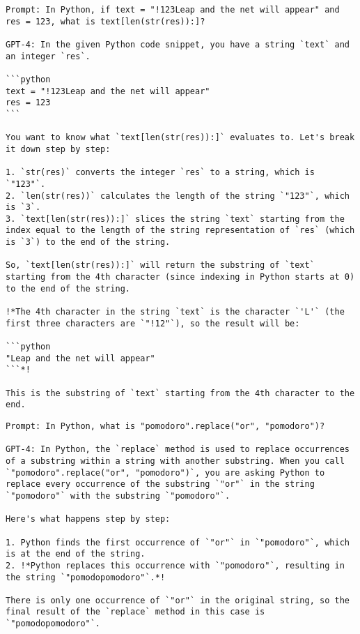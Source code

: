 \begin{lstlisting}
Prompt: In Python, if text = "!123Leap and the net will appear" and res = 123, what is text[len(str(res)):]?

GPT-4: In the given Python code snippet, you have a string `text` and an integer `res`.

```python
text = "!123Leap and the net will appear"
res = 123
```

You want to know what `text[len(str(res)):]` evaluates to. Let's break it down step by step:

1. `str(res)` converts the integer `res` to a string, which is `"123"`.
2. `len(str(res))` calculates the length of the string `"123"`, which is `3`.
3. `text[len(str(res)):]` slices the string `text` starting from the index equal to the length of the string representation of `res` (which is `3`) to the end of the string.

So, `text[len(str(res)):]` will return the substring of `text` starting from the 4th character (since indexing in Python starts at 0) to the end of the string.

!*The 4th character in the string `text` is the character `'L'` (the first three characters are `"!12"`), so the result will be:

```python
"Leap and the net will appear"
```*!

This is the substring of `text` starting from the 4th character to the end.
\end{lstlisting}

\begin{lstlisting}
Prompt: In Python, what is "pomodoro".replace("or", "pomodoro")?

GPT-4: In Python, the `replace` method is used to replace occurrences of a substring within a string with another substring. When you call `"pomodoro".replace("or", "pomodoro")`, you are asking Python to replace every occurrence of the substring `"or"` in the string `"pomodoro"` with the substring `"pomodoro"`.

Here's what happens step by step:

1. Python finds the first occurrence of `"or"` in `"pomodoro"`, which is at the end of the string.
2. !*Python replaces this occurrence with `"pomodoro"`, resulting in the string `"pomodopomodoro"`.*!

There is only one occurrence of `"or"` in the original string, so the final result of the `replace` method in this case is `"pomodopomodoro"`.
\end{lstlisting}

